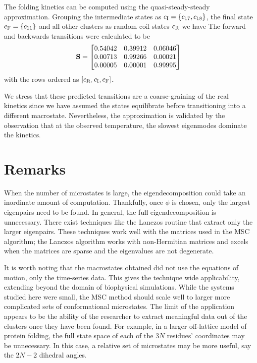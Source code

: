 The folding kinetics can be computed using the quasi-steady-steady approximation. Grouping the intermediate states as $c_{\mathrm{I}} = \left \{ c_{17}, c_{18} \right \}$, the final state $c_{\mathrm{F}} = \left \{ c_{11} \right \}$ and all other clusters as random coil states $c_{\mathrm{R}}$ we have
%
%
The forward and backwards transitions were calculated to be
\begin{equation}
  {\bf S} =
  \begin{bmatrix}
    0.54042 & 0.39912 & 0.06046 \\
    0.00713 & 0.99266 & 0.00021 \\
    0.00005 & 0.00001 & 0.99995 \\
  \end{bmatrix}
\end{equation}
with the rows ordered as $\left[  c_{\mathrm{R}}, c_{\mathrm{I}}, c_{\mathrm{F}}  \right]$.

We stress that these predicted transitions are a coarse-graining of the real kinetics since we have assumed the states equilibrate before transitioning into a different macrostate. Nevertheless, the approximation is validated by the observation that at the observed temperature, the slowest eigenmodes dominate the kinetics. 

\section {Remarks}

When the number of microstates is large, the eigendecomposition could take an inordinate amount of computation. Thankfully, once $\phi$ is chosen, only the largest eigenpairs need to be found. In general, the full eigendecomposition is unnecessary. There exist techniques like the Lanczos routine that extract only the larger eigenpairs.\cite{komzsik_lanczos_1987} These techniques work well with the matrices used in the MSC algorithm; the Lanczos algorithm works with non-Hermitian matrices and excels when the matrices are sparse and the eigenvalues are not degenerate.

It is worth noting that the macrostates obtained did not use the equations of motion, only the time-series data. This gives the technique  wide applicability, extending beyond the domain of biophysical simulations. While the systems studied here were small, the MSC method should scale well to larger more complicated sets of conformational microstates. The limit of the application appears to be the ability of the researcher to extract meaningful data out of the clusters once they have been found. For example, in a larger off-lattice model of protein folding, the full state space of each of the $3N$ residues' coordinates may be unnecessary. In this case, a relative set of microstates may be more useful, say the $2N-2$ dihedral angles.


